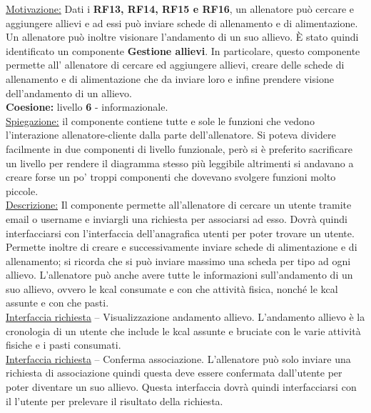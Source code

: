 \documentclass{article}
\begin{document}
      \underline{Motivazione:} Dati i \textbf{RF13, RF14, RF15 e RF16}, un allenatore può cercare e aggiungere allievi e ad essi può inviare schede di allenamento e di alimentazione. Un
      allenatore può inoltre visionare l’andamento di un suo allievo. È stato quindi identificato un componente \textbf{Gestione allievi}. In particolare, questo componente permette all’
      allenatore di cercare ed aggiungere allievi, creare delle schede di allenamento e di alimentazione che da inviare loro e infine prendere visione dell’andamento di un allievo.\\

      \textbf{Coesione:} livello \textbf{6} - informazionale.\\

      \underline{Spiegazione:} il componente contiene tutte e sole le funzioni che vedono l’interazione allenatore-cliente dalla parte dell’allenatore. Si poteva dividere facilmente
      in due componenti di livello funzionale, però si è preferito sacrificare un livello per rendere il diagramma stesso più leggibile altrimenti si andavano a creare forse un po’ 
      troppi componenti che dovevano svolgere funzioni molto piccole.\\

      \underline{Descrizione:} Il componente permette all’allenatore di cercare un utente tramite email o username e inviargli una richiesta per associarsi ad esso. Dovrà quindi
      interfacciarsi con l’interfaccia dell’anagrafica utenti per poter trovare un utente. Permette inoltre di creare e successivamente inviare schede di alimentazione e di
      allenamento; si ricorda che si può inviare massimo una scheda per tipo ad ogni allievo. L’allenatore può anche avere tutte le informazioni sull’andamento di un suo allievo,
      ovvero le kcal consumate e con che attività fisica, nonché le kcal assunte e con che pasti.\\

      \underline{Interfaccia richiesta} – Visualizzazione andamento allievo. L’andamento allievo è la cronologia di un utente che include le kcal assunte e bruciate con le varie
      attività fisiche e i pasti consumati.\\

      \underline{Interfaccia richiesta} – Conferma associazione. L’allenatore può solo inviare una richiesta di associazione quindi questa deve essere confermata dall’utente per poter
      diventare un suo allievo. Questa interfaccia dovrà quindi interfacciarsi con il l’utente per prelevare il risultato della richiesta.\\
\end{document}
